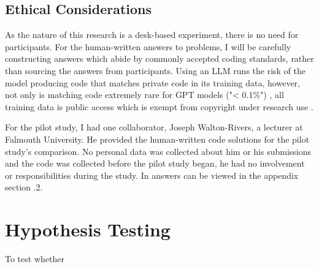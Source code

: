 \documentclass[manuscript,screen,review,sigconf]{acmart}
\begin{document}
\subsection{Ethical Considerations}
As the nature of this research is a desk-based experiment, there is no need for participants. For the human-written answers to problems, I will be carefully constructing answers which abide by commonly accepted coding standards, rather than sourcing the answers from participants. Using an LLM runs the risk of the model producing code that matches private code in its training data, however, not only is matching code extremely rare for GPT models ("< 0.1\%") \cite{CodexRelPaper}, all training data is public access which is exempt from copyright under research use \cite{ExceptionToCopyright}.

For the pilot study, I had one collaborator, Joseph Walton-Rivers, a lecturer at Falmouth University. He provided the human-written code solutions for the pilot study's comparison. No personal data was collected about him or his submissions and the code was collected before the pilot study began, he had no involvement or responsibilities during the study. In answers can be viewed in the appendix section .2. %

\section{Hypothesis Testing}
To test whether
\end{document}

